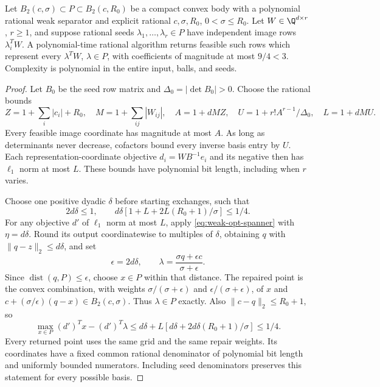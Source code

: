 \begin{lemma}\label{lem:rational-spanner}
Let $B_2(c,\sigma)\subset P\subset B_2(c,R_0)$ be a compact convex
body with a polynomial rational weak separator and explicit rational
$c,\sigma,R_0$, $0<\sigma\le R_0$. Let $W\in\Q^{d\times r}$,
$r\ge1$, and suppose rational seeds $\lambda_1,\ldots,\lambda_r\in P$
have independent image rows $\lambda_i^TW$. A polynomial-time rational
algorithm returns feasible such rows which represent every
$\lambda^TW$, $\lambda\in P$, with coefficients of magnitude at most
$9/4<3$. Complexity is polynomial in the entire input, balls, and seeds.
\end{lemma}
\begin{proof}
Let $B_0$ be the seed row matrix and $\Delta_0=|\det B_0|>0$.
Choose the rational bounds
\[
 Z=1+\sum_i|c_i|+R_0,\quad M=1+\sum_{ij}|W_{ij}|,\quad
 A=1+dMZ,\quad U=1+r!A^{r-1}/\Delta_0,\quad L=1+dMU.
\]
Every feasible image coordinate has magnitude at most $A$.
As long as determinants never decrease, cofactors bound every inverse
basis entry by $U$. Each representation-coordinate objective
$d_i=WB^{-1}e_i$ and its negative then has $\ell_1$ norm at most $L$.
These bounds have polynomial bit length, including when $r$ varies.

Choose one positive dyadic $\delta$ before starting exchanges, such that
\begin{equation}\label{eq:fixed-spanner-grid}
 2d\delta\le1,\qquad
 d\delta[1+L+2L(R_0+1)/\sigma]\le1/4.
\end{equation}
For any objective $d'$ of $\ell_1$ norm at most $L$, apply
\eqref{eq:weak-opt-spanner} with $\eta=d\delta$. Round its output
coordinatewise to multiples of $\delta$, obtaining $q$ with
$\|q-z\|_2\le d\delta$, and set
\begin{equation}\label{eq:spanner-repair}
 \epsilon=2d\delta,\qquad
 \lambda=\frac{\sigma q+\epsilon c}{\sigma+\epsilon}.
\end{equation}
Since $\operatorname{dist}(q,P)\le\epsilon$, choose $x\in P$ within
that distance. The repaired point is the convex combination, with
weights $\sigma/(\sigma+\epsilon)$ and
$\epsilon/(\sigma+\epsilon)$, of $x$ and
$c+(\sigma/\epsilon)(q-x)\in B_2(c,\sigma)$.
Thus $\lambda\in P$ exactly. Also $\|c-q\|_2\le R_0+1$, so
\[
 \max_{x\in P}(d')^Tx-(d')^T\lambda
 \le d\delta+L[d\delta+2d\delta(R_0+1)/\sigma]\le1/4.
\]
Every returned point uses the same grid and the same repair weights.
Its coordinates have a fixed common rational denominator of polynomial
bit length and uniformly bounded numerators. Including seed denominators
preserves this statement for every possible basis.


\end{proof}
